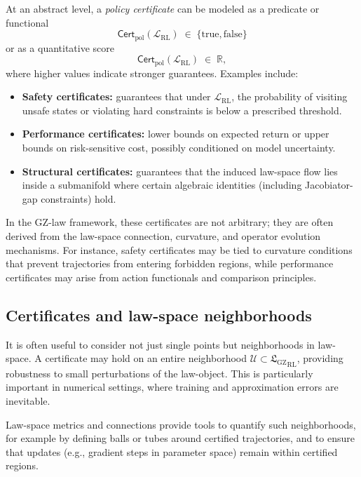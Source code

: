 \documentclass[11pt]{book}
\newcommand{\GZLS}{\ensuremath{\mathfrak{L}_{\mathrm{GZ}}}}
\theoremstyle{plain}
\theoremstyle{definition}
\theoremstyle{remark}
\begin{document}
At an abstract level, a \emph{policy certificate} can be modeled as
a predicate or functional
\[
   \mathsf{Cert}_{\mathrm{pol}}(\mathcal{L}_{\mathrm{RL}})
   \;\in\; \{\text{true},\text{false}\}
\]
or as a quantitative score
\[
   \mathsf{Cert}_{\mathrm{pol}}(\mathcal{L}_{\mathrm{RL}})
   \;\in\; \mathbb{R},
\]
where higher values indicate stronger guarantees. Examples include:
\begin{itemize}
  \item \textbf{Safety certificates:}
        guarantees that under $\mathcal{L}_{\mathrm{RL}}$, the
        probability of visiting unsafe states or violating hard
        constraints is below a prescribed threshold.
  \item \textbf{Performance certificates:}
        lower bounds on expected return or upper bounds on
        risk-sensitive cost, possibly conditioned on model
        uncertainty.
  \item \textbf{Structural certificates:}
        guarantees that the induced law-space flow lies inside a
        submanifold where certain algebraic identities (including
        Jacobiator-gap constraints) hold.
\end{itemize}

In the GZ-law framework, these certificates are not arbitrary; they
are often derived from the law-space connection, curvature, and
operator evolution mechanisms. For instance, safety certificates may
be tied to curvature conditions that prevent trajectories from
entering forbidden regions, while performance certificates may arise
from action functionals and comparison principles.

\subsection*{Certificates and law-space neighborhoods}

It is often useful to consider not just single points but
neighborhoods in law-space. A certificate may hold on an entire
neighborhood $\mathcal{U} \subset {\GZLS}_{\mathrm{RL}}$, providing
robustness to small perturbations of the law-object. This is
particularly important in numerical settings, where training and
approximation errors are inevitable.

Law-space metrics and connections provide tools to quantify such
neighborhoods, for example by defining balls or tubes around
certified trajectories, and to ensure that updates (e.g., gradient
steps in parameter space) remain within certified regions.
\end{document}
